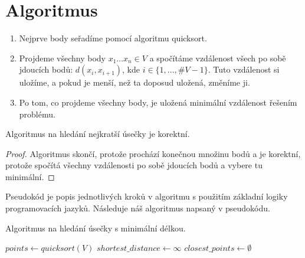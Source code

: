 \section{Algoritmus}
\label{sec:algoritmus_1D}
\begin{enumerate}
    \item Nejprve body seřadíme pomocí algoritmu quicksort.
    \item Projdeme všechny body $x_1\ldots x_n \in V$ a spočítáme vzdálenost všech po sobě jdoucích bodů: $d(x_i, x_{i+1})$, kde $i \in \{1,...,\#V-1\}$. Tuto vzdálenost si uložíme, a pokud je menší, než ta doposud uložená, změníme ji.
    \item Po tom, co projdeme všechny body, je uložená minimální vzdálenost řešením problému.
\end{enumerate}
\begin{tvrzeni}
    Algoritmus na hledání nejkratší úsečky je korektní.
\end{tvrzeni}
\begin{proof}
    Algoritmus skončí, protože prochází konečnou množinu bodů a je korektní, protože spočítá všechny vzdálenosti po sobě jdoucích bodů a vybere tu minimální.
\end{proof}


\begin{poznamka}
    Pseudokód je popis jednotlivých kroků v algoritmu s použitím základní logiky programovacích jazyků. Následuje náš algoritmus napsaný v pseudokódu.
\end{poznamka}

\begin{algorithm}[H]
    \caption{Algoritmus na hledání úsečky s minimální délkou.}
    \label{alg:algoritmus_1D}


    \BlankLine
    $points \leftarrow quicksort(V) $\;
    $shortest\_distance \leftarrow \infty$ \;
    $ closest\_points \leftarrow \emptyset $ \;
\end{algorithm}